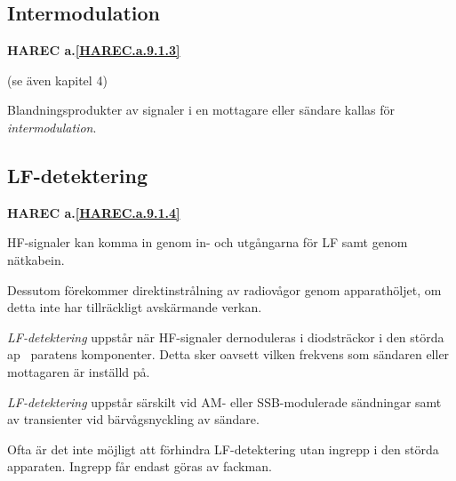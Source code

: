 \subsection{Intermodulation}
\textbf{
HAREC a.\ref{HAREC.a.9.1.3}\label{myHAREC.a.9.1.3}
}

(se även kapitel 4)

Blandningsprodukter av signaler i en mottagare eller sändare kallas
för \emph{intermodulation}.

\subsection{LF-detektering}
\textbf{
HAREC a.\ref{HAREC.a.9.1.4}\label{myHAREC.a.9.1.4}
}

HF-signaler kan komma in genom in- och utgångarna för LF samt genom
nätkabein.

Dessutom förekommer direktinstrålning av radiovågor genom
apparathöljet, om detta inte har tillräckligt avskärmande verkan.

\emph{LF-detektering} uppstår när HF-signaler dernoduleras i
diodsträckor i den störda ap~ paratens komponenter. Detta sker oavsett
vilken frekvens som sändaren eller mottagaren är inställd på.

\emph{LF-detektering} uppstår särskilt vid AM- eller SSB-modulerade
sändningar samt av transienter vid bärvågsnyckling av sändare.

Ofta är det inte möjligt att förhindra LF-detektering utan ingrepp i
den störda apparaten. Ingrepp får endast göras av fackman.

